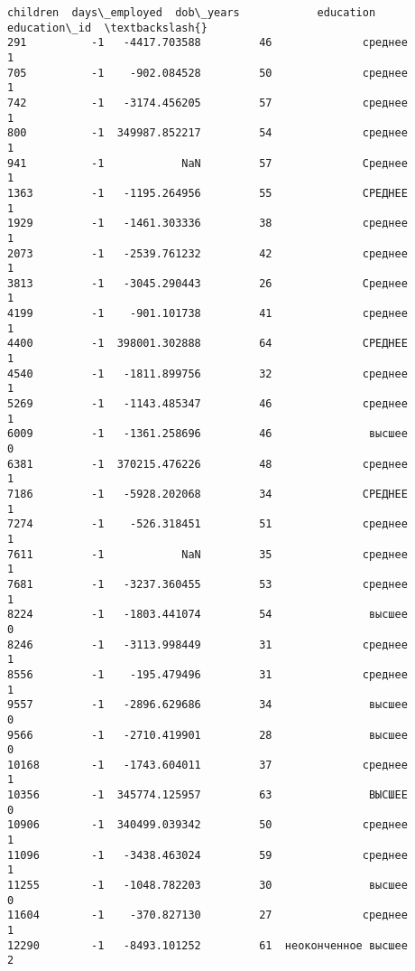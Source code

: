 \documentclass[11pt]{article}
\begin{document}
    \begin{Verbatim}[commandchars=\\\{\}]
       children  days\_employed  dob\_years            education  education\_id  \textbackslash{}
291          -1   -4417.703588         46              среднее             1
705          -1    -902.084528         50              среднее             1
742          -1   -3174.456205         57              среднее             1
800          -1  349987.852217         54              среднее             1
941          -1            NaN         57              Среднее             1
1363         -1   -1195.264956         55              СРЕДНЕЕ             1
1929         -1   -1461.303336         38              среднее             1
2073         -1   -2539.761232         42              среднее             1
3813         -1   -3045.290443         26              Среднее             1
4199         -1    -901.101738         41              среднее             1
4400         -1  398001.302888         64              СРЕДНЕЕ             1
4540         -1   -1811.899756         32              среднее             1
5269         -1   -1143.485347         46              среднее             1
6009         -1   -1361.258696         46               высшее             0
6381         -1  370215.476226         48              среднее             1
7186         -1   -5928.202068         34              СРЕДНЕЕ             1
7274         -1    -526.318451         51              среднее             1
7611         -1            NaN         35              среднее             1
7681         -1   -3237.360455         53              среднее             1
8224         -1   -1803.441074         54               высшее             0
8246         -1   -3113.998449         31              среднее             1
8556         -1    -195.479496         31              среднее             1
9557         -1   -2896.629686         34               высшее             0
9566         -1   -2710.419901         28               высшее             0
10168        -1   -1743.604011         37              среднее             1
10356        -1  345774.125957         63               ВЫСШЕЕ             0
10906        -1  340499.039342         50              среднее             1
11096        -1   -3438.463024         59              среднее             1
11255        -1   -1048.782203         30               высшее             0
11604        -1    -370.827130         27              среднее             1
12290        -1   -8493.101252         61  неоконченное высшее             2

\end{Verbatim}
\end{document}
